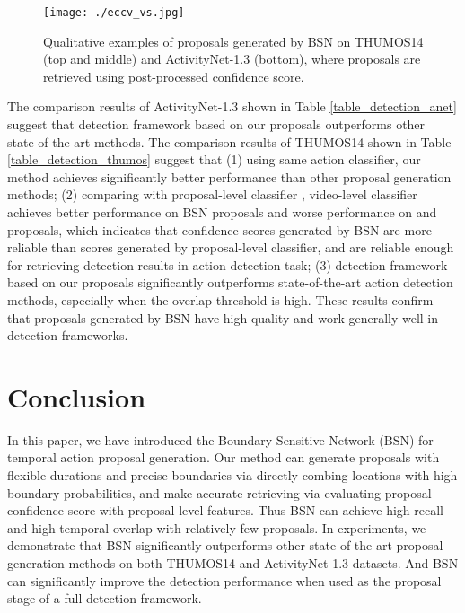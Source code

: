 \documentclass[runningheads]{llncs}
\begin{document}
\begin{figure}[t]
\setlength{\abovecaptionskip}{-0.3cm} %
\setlength{\belowcaptionskip}{-0.3cm} %
\begin{center}
\begin{minipage}[b]{1.0\linewidth}
  \centering
  \centerline{\texttt{[image: ./eccv\_vs.jpg]}}
  \medskip
\end{minipage}
\end{center}
   \caption{Qualitative examples of proposals generated by BSN on THUMOS14 (top and middle) and ActivityNet-1.3 (bottom), where proposals are retrieved using  post-processed confidence score. }
\label{fig_vs}
\vspace{-0.2cm}
\end{figure}

The comparison results of ActivityNet-1.3 shown in Table \ref{table_detection_anet} suggest that  detection framework based on our proposals outperforms other state-of-the-art methods.
The comparison results of THUMOS14 shown in Table \ref{table_detection_thumos} suggest that
(1) using same action classifier, our method achieves significantly better performance than other proposal generation methods;
(2) comparing  with  proposal-level classifier \cite{shou2016action}, video-level classifier \cite{wang2017untrimmednets} achieves better performance on BSN proposals and worse performance  on \cite{sst_buch_cvpr17} and \cite{gao2017turn} proposals, which indicates that confidence scores generated by BSN are more reliable than scores generated by proposal-level classifier, and are reliable enough for retrieving detection results in action detection task;
(3) detection framework based on our proposals significantly outperforms  state-of-the-art action detection methods, especially when the overlap threshold is high.
These results confirm that proposals generated by BSN have high quality and work generally well in detection frameworks. %










\section{Conclusion}

In this paper, we have introduced the Boundary-Sensitive Network (BSN) for temporal action proposal generation. Our method can generate proposals with flexible durations and precise boundaries via directly combing locations with high boundary probabilities, and make accurate  retrieving via evaluating proposal confidence score with proposal-level features. Thus BSN can achieve high recall and high temporal overlap with relatively few proposals.
In experiments, we demonstrate that BSN significantly outperforms other state-of-the-art proposal generation methods on both THUMOS14 and ActivityNet-1.3 datasets. And BSN can significantly improve  the detection performance when used as the proposal stage of a full detection framework.


\newpage



\end{document}
